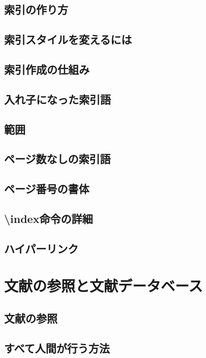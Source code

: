 \documentclass{jsbook}
\begin{document}
\section{索引の作り方}

\section{索引スタイルを変えるには}

\section{索引作成の仕組み}

\section{入れ子になった索引語}

\section{範囲}

\section{ページ数なしの索引語}

\section{ページ番号の書体}

\section{\textbackslash index命令の詳細}

\section{ハイパーリンク}

\chapter{文献の参照と文献データベース}

\section{文献の参照}

\section{すべて人間が行う方法}
\end{document}
